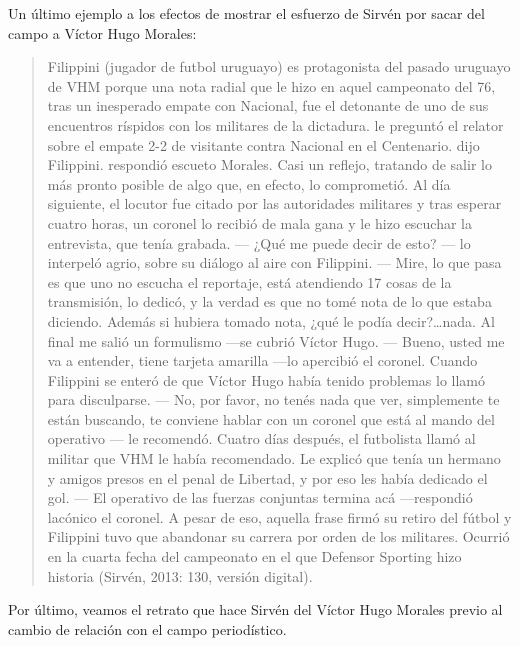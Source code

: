 Un último ejemplo a los efectos de mostrar el esfuerzo de Sirvén por sacar del campo a Víctor Hugo Morales:

\begin{quote}
Filippini (jugador de futbol uruguayo) es protagonista del pasado uruguayo de VHM porque una nota radial que le hizo en aquel campeonato del 76, tras un inesperado empate con Nacional, fue el detonante de uno de sus encuentros ríspidos con los militares de la dictadura.  le preguntó el relator sobre el empate 2-2 de visitante contra Nacional en el Centenario.  dijo Filippini.  respondió escueto Morales. Casi un reflejo, tratando de salir lo más pronto posible de algo que, en efecto, lo comprometió. Al día siguiente, el locutor fue citado por las autoridades militares y tras esperar cuatro horas, un coronel lo recibió de mala gana y le hizo escuchar la entrevista, que tenía grabada. --- ¿Qué me puede decir de esto? --- lo interpeló agrio, sobre su diálogo al aire con Filippini. --- Mire, lo que pasa es que uno no escucha el reportaje, está atendiendo 17 cosas de la transmisión, lo dedicó, y la verdad es que no tomé nota de lo que estaba diciendo. Además si hubiera tomado nota, ¿qué le podía decir?\ldots nada. Al final me salió un formulismo ---se cubrió Víctor Hugo. --- Bueno, usted me va a entender, tiene tarjeta amarilla ---lo apercibió el coronel. Cuando Filippini se enteró de que Víctor Hugo había tenido problemas lo llamó para disculparse. --- No, por favor, no tenés nada que ver, simplemente te están buscando, te conviene hablar con un coronel que está al mando del operativo --- le recomendó. Cuatro días después, el futbolista llamó al militar que VHM le había recomendado. Le explicó que tenía un hermano y amigos presos en el penal de Libertad, y por eso les había dedicado el gol. --- El operativo de las fuerzas conjuntas termina acá ---respondió lacónico el coronel. A pesar de eso, aquella frase firmó su retiro del fútbol y Filippini tuvo que abandonar su carrera por orden de los militares. Ocurrió en la cuarta fecha del campeonato en el que Defensor Sporting hizo historia (Sirvén, 2013: 130, versión digital).
\end{quote}

Por último, veamos el retrato que hace Sirvén del Víctor Hugo Morales previo al cambio de relación con el campo periodístico.


